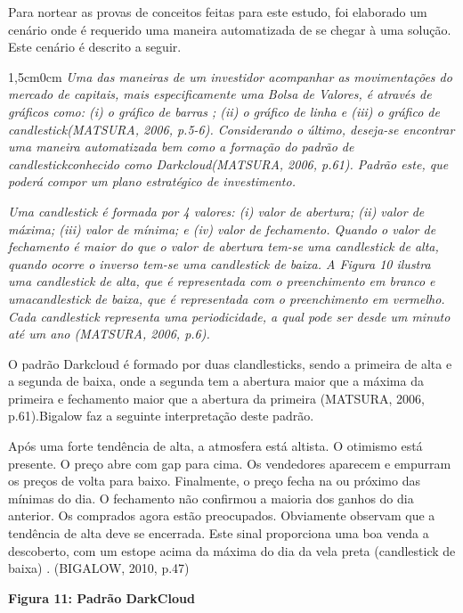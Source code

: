 Para nortear as provas de conceitos feitas para este estudo, foi elaborado um cenário onde é requerido uma maneira automatizada de se chegar à uma solução. Este cenário é descrito a seguir.

\begin{adjustwidth}{1,5cm}{0cm}
\textit{Uma das maneiras de um investidor acompanhar as movimentações do mercado de capitais, mais especificamente uma Bolsa de Valores, é através de gráficos como: (i) o gráfico de barras ; (ii) o gráfico de linha  e (iii) o gráfico de candlestick(MATSURA, 2006, p.5-6). Considerando o último, deseja-se encontrar uma maneira automatizada bem como a formação do padrão de candlestickconhecido como Darkcloud(MATSURA, 2006, p.61). Padrão este, que poderá compor um plano estratégico de investimento.}

\textit{Uma candlestick é formada por 4 valores: (i) valor de abertura; (ii) valor de máxima; (iii) valor de mínima; e (iv) valor de fechamento. Quando o valor de  fechamento é maior do que o valor de abertura tem-se uma candlestick de alta, quando ocorre o inverso tem-se uma candlestick de baixa. A Figura 10 ilustra uma candlestick de alta, que é representada com o preenchimento em branco e umacandlestick de baixa, que é representada com o preenchimento em vermelho. Cada candlestick representa uma periodicidade, a qual pode ser desde um minuto até um ano (MATSURA, 2006, p.6).}
\end{adjustwidth}

O padrão Darkcloud é formado por duas clandlesticks, sendo a primeira de alta e a segunda de baixa, onde a segunda tem a abertura maior que a máxima da primeira e fechamento maior que a abertura da primeira (MATSURA, 2006, p.61).Bigalow faz a seguinte interpretação deste padrão.

\begin{citacao}
Após uma forte tendência de alta, a atmosfera está altista. O otimismo está presente. O preço abre com gap para cima. Os vendedores aparecem e empurram os preços de volta para baixo. Finalmente, o preço fecha na ou próximo das mínimas do dia. O fechamento não confirmou a maioria dos ganhos do dia anterior. Os comprados agora estão preocupados. Obviamente observam que a tendência de alta deve se encerrada. Este sinal proporciona uma boa venda a descoberto, com um estope acima da máxima do dia da vela preta (candlestick de baixa) . 
(BIGALOW, 2010, p.47)
\end{citacao}

\textbf{Figura 11: Padrão DarkCloud}

